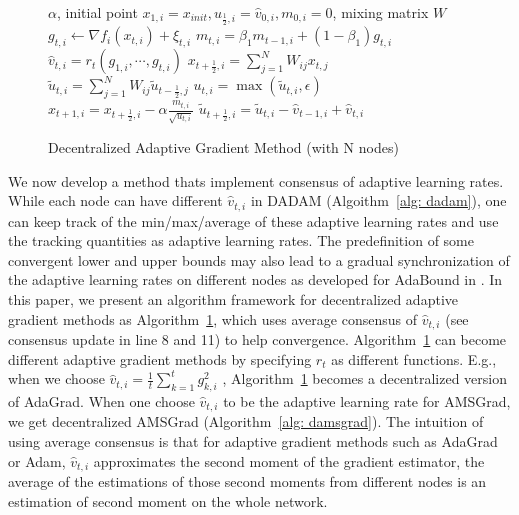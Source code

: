 \documentclass{article} %
\begin{document}
\begin{figure}\vspace{-0.3in}
\begin{minipage}{\linewidth}
\begin{algorithm}[H]
	\caption{Decentralized Adaptive Gradient Method (with N nodes)}
	\label{alg: dadaptive}
	\begin{algorithmic}[1]
		  $\alpha$, initial point $x_{1,i} = x_{init}, u_{\frac{1}{2},i} = \hat v_{0,i}, m_{0,i}=0$, mixing matrix $W$
		\STATE  $g_{t,i}  \leftarrow \nabla f_i(x_{t,i}) + \xi_{t,i}$
		\STATE $m_{t,i} = \beta_1 m_{t-1,i} + (1-\beta_1) g_{t,i}$ 
		\STATE $\hat v_{t,i} = r_t(g_{1,i},\cdots,g_{t,i})$
		\STATE $x_{t+\frac{1}{2},i} = \sum_{j=1}^N W_{ij}x_{t,j}$
	    \STATE $\tilde u_{t,i} = \sum_{j=1}^N W_{ij} \tilde u_{t-\frac{1}{2},j}$
	    \STATE $u_{t,i} = \max(\tilde u_{t,i}, \epsilon)$
		\STATE $x_{t+1,i} = x_{t+\frac{1}{2},i} - \alpha \frac{m_{t,i}}{\sqrt{u_{t,i}}}$
		\STATE $\tilde u_{t+\frac{1}{2},i} = \tilde u_{t,i} - \hat v_{t-1,i} + \hat v_{t,i}$
		\ENDFAP
		\ENDFOR
	\end{algorithmic}
\end{algorithm}
\end{minipage}
\end{figure}
We now develop a method thats implement consensus of adaptive learning rates.
While each node can have different $\hat v_{t,i}$ in DADAM (Algoithm~\ref{alg: dadam}), one can keep track of the min/max/average of these adaptive learning rates and use the tracking quantities as adaptive learning rates. 
The predefinition of some convergent lower and upper bounds may also lead to a gradual synchronization of the adaptive learning rates on different nodes as developed for AdaBound in \citet{luo2019adaptive}.
In this paper, we present an algorithm framework for decentralized adaptive gradient methods as Algorithm~\ref{alg: dadaptive}, which uses average consensus of $\hat v_{t,i}$ (see consensus update in line 8 and 11) to help convergence.  Algorithm~\ref{alg: dadaptive} can become different adaptive gradient methods by specifying $r_t$ as different functions. E.g., when we choose $\hat v_{t,i} = {\frac{1}{t}\sum_{k=1}^t g_{k,i}^2}$ , Algorithm~\ref{alg: dadaptive} becomes a decentralized version of AdaGrad. When one choose $\hat v_{t,i}$ to be the adaptive learning rate for AMSGrad, we get decentralized AMSGrad (Algorithm~\ref{alg: damsgrad}).
The intuition of using average consensus is that for adaptive gradient methods such as AdaGrad or Adam, $\hat v_{t,i}$ approximates the second moment of the gradient estimator, the average of the estimations of those second moments from different nodes is an estimation of second moment on the whole network.  
\end{document}
